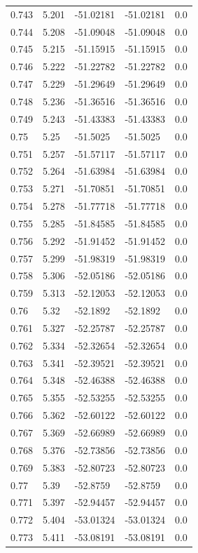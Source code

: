 \begin{tabular}{lllll}
0.743 & 5.201 & -51.02181 & -51.02181 & 0.0 \\
0.744 & 5.208 & -51.09048 & -51.09048 & 0.0 \\
0.745 & 5.215 & -51.15915 & -51.15915 & 0.0 \\
0.746 & 5.222 & -51.22782 & -51.22782 & 0.0 \\
0.747 & 5.229 & -51.29649 & -51.29649 & 0.0 \\
0.748 & 5.236 & -51.36516 & -51.36516 & 0.0 \\
0.749 & 5.243 & -51.43383 & -51.43383 & 0.0 \\
0.75 & 5.25 & -51.5025 & -51.5025 & 0.0 \\
0.751 & 5.257 & -51.57117 & -51.57117 & 0.0 \\
0.752 & 5.264 & -51.63984 & -51.63984 & 0.0 \\
0.753 & 5.271 & -51.70851 & -51.70851 & 0.0 \\
0.754 & 5.278 & -51.77718 & -51.77718 & 0.0 \\
0.755 & 5.285 & -51.84585 & -51.84585 & 0.0 \\
0.756 & 5.292 & -51.91452 & -51.91452 & 0.0 \\
0.757 & 5.299 & -51.98319 & -51.98319 & 0.0 \\
0.758 & 5.306 & -52.05186 & -52.05186 & 0.0 \\
0.759 & 5.313 & -52.12053 & -52.12053 & 0.0 \\
0.76 & 5.32 & -52.1892 & -52.1892 & 0.0 \\
0.761 & 5.327 & -52.25787 & -52.25787 & 0.0 \\
0.762 & 5.334 & -52.32654 & -52.32654 & 0.0 \\
0.763 & 5.341 & -52.39521 & -52.39521 & 0.0 \\
0.764 & 5.348 & -52.46388 & -52.46388 & 0.0 \\
0.765 & 5.355 & -52.53255 & -52.53255 & 0.0 \\
0.766 & 5.362 & -52.60122 & -52.60122 & 0.0 \\
0.767 & 5.369 & -52.66989 & -52.66989 & 0.0 \\
0.768 & 5.376 & -52.73856 & -52.73856 & 0.0 \\
0.769 & 5.383 & -52.80723 & -52.80723 & 0.0 \\
0.77 & 5.39 & -52.8759 & -52.8759 & 0.0 \\
0.771 & 5.397 & -52.94457 & -52.94457 & 0.0 \\
0.772 & 5.404 & -53.01324 & -53.01324 & 0.0 \\
0.773 & 5.411 & -53.08191 & -53.08191 & 0.0 \\

\end{tabular}
